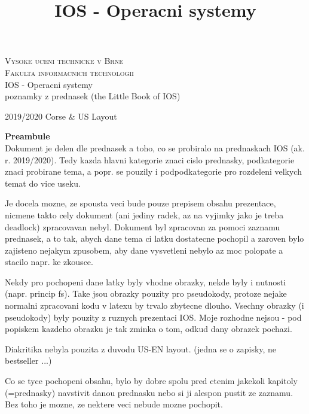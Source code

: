 \documentclass[a4paper, 11pt]{article}
\title{IOS - Operacni systemy}
\date{}
\begin{document}
\begin{titlepage}

\begin{center}
\LARGE
\textsc{\Huge Vysoke uceni technicke v Brne}\\
\textsc{\huge Fakulta informacnich technologii}\\
IOS - Operacni systemy\\[0.4em]
{\Huge poznamky z prednasek (the Little Book of IOS)}
\end{center}
{\Large 2019/2020 \hfill Corse \& US Layout}

\end{titlepage}


\tableofcontents


\newpage

\textbf{Preambule} \\

Dokument je delen dle prednasek a toho, co se probiralo na prednaskach IOS (ak. r. 2019/2020). Tedy kazda hlavni kategorie znaci cislo prednasky, podkategorie znaci probirane tema, a popr. se pouzily i podpodkategorie pro rozdeleni velkych temat do vice useku.

Je docela mozne, ze spousta veci bude pouze prepisem obsahu prezentace, nicmene takto cely dokument (ani jediny radek, az na vyjimky jako je treba deadlock) zpracovavan nebyl. Dokument byl zpracovan za pomoci zaznamu prednasek, a to tak, abych dane tema ci latku dostatecne pochopil a zaroven bylo zajisteno nejakym zpusobem, aby dane vysvetleni nebylo az moc polopate a stacilo napr. ke zkousce.

Nekdy pro pochopeni dane latky byly vhodne obrazky, nekde byly i nutnosti (napr. princip fs). Take jsou obrazky pouzity pro pseudokody, protoze nejake normalni zpracovani kodu v latexu by trvalo zbytecne dlouho. Vsechny obrazky (i pseudokody) byly pouzity z ruznych prezentaci IOS. Moje rozhodne nejsou - pod popiskem kazdeho obrazku je tak zminka o tom, odkud dany obrazek pochazi.

Diakritika nebyla pouzita z duvodu US-EN layout. (jedna se o zapisky, ne bestseller ...)

Co se tyce pochopeni obsahu, bylo by dobre spolu pred ctenim jakekoli kapitoly (=prednasky) navstivit danou prednasku nebo si ji alespon pustit ze zaznamu. Bez toho je mozne, ze nektere veci nebude mozne pochopit. 
\end{document}
